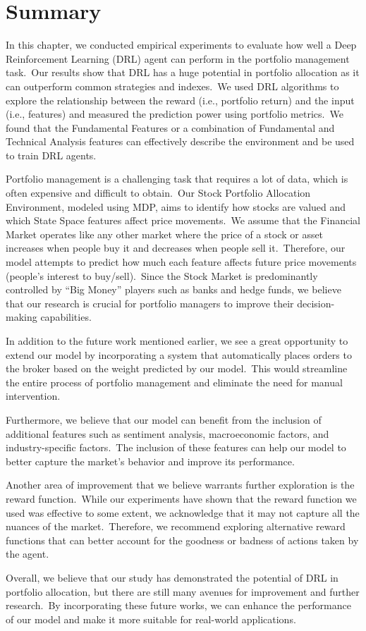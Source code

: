\documentclass[../xlapes02]{subfiles}
\begin{document}
    \section{Summary}\label{sec:summary}
    In this chapter, we conducted empirical experiments to evaluate how well a Deep Reinforcement Learning (DRL) agent can perform in the portfolio management task.\ Our results show that DRL has a huge potential in portfolio allocation as it can outperform common strategies and indexes.\ We used DRL algorithms to explore the relationship between the reward (i.e., portfolio return) and the input (i.e., features) and measured the prediction power using portfolio metrics.\ We found that the Fundamental Features or a combination of Fundamental and Technical Analysis features can effectively describe the environment and be used to train DRL agents.

    Portfolio management is a challenging task that requires a lot of data, which is often expensive and difficult to obtain.\ Our Stock Portfolio Allocation Environment, modeled using MDP, aims to identify how stocks are valued and which State Space features affect price movements.\ We assume that the Financial Market operates like any other market where the price of a stock or asset increases when people buy it and decreases when people sell it.\ Therefore, our model attempts to predict how much each feature affects future price movements (people's interest to buy/sell).\ Since the Stock Market is predominantly controlled by ``Big Money'' players such as banks and hedge funds, we believe that our research is crucial for portfolio managers to improve their decision-making capabilities.

    In addition to the future work mentioned earlier, we see a great opportunity to extend our model by incorporating a system that automatically places orders to the broker based on the weight predicted by our model.\ This would streamline the entire process of portfolio management and eliminate the need for manual intervention.

    Furthermore, we believe that our model can benefit from the inclusion of additional features such as sentiment analysis, macroeconomic factors, and industry-specific factors.\ The inclusion of these features can help our model to better capture the market's behavior and improve its performance.

    Another area of improvement that we believe warrants further exploration is the reward function.\ While our experiments have shown that the reward function we used was effective to some extent, we acknowledge that it may not capture all the nuances of the market.\ Therefore, we recommend exploring alternative reward functions that can better account for the goodness or badness of actions taken by the agent.

    Overall, we believe that our study has demonstrated the potential of DRL in portfolio allocation, but there are still many avenues for improvement and further research.\ By incorporating these future works, we can enhance the performance of our model and make it more suitable for real-world applications.
\end{document}
